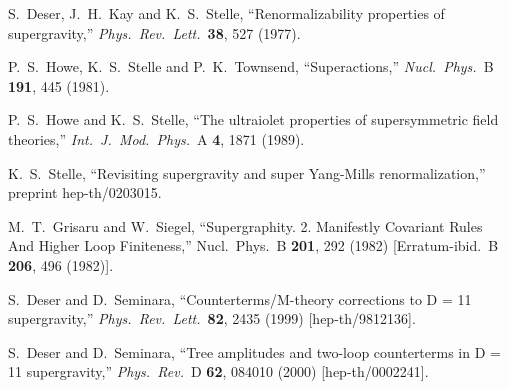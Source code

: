 \begin{thebibliography}{99}
S.~Deser, J.~H.~Kay and K.~S.~Stelle,
``Renormalizability properties of supergravity,''
{\it Phys.\ Rev.\ Lett.}\  {\bf 38}, 527 (1977).

P.~S.~Howe, K.~S.~Stelle and P.~K.~Townsend,
``Superactions,''
{\it Nucl.\ Phys.}\ B {\bf 191}, 445 (1981).

P.~S.~Howe and K.~S.~Stelle,
``The ultraiolet properties of supersymmetric field theories,''
{\it Int.\ J.\ Mod.\ Phys.}\ A {\bf 4}, 1871 (1989).

K.~S.~Stelle,
``Revisiting supergravity and super Yang-Mills renormalization,''
preprint hep-th/0203015.

M.~T.~Grisaru and W.~Siegel,
``Supergraphity. 2. Manifestly Covariant Rules And Higher Loop Finiteness,''
Nucl.\ Phys.\ B {\bf 201}, 292 (1982)
[Erratum-ibid.\ B {\bf 206}, 496 (1982)].

S.~Deser and D.~Seminara,
``Counterterms/M-theory corrections to D = 11 supergravity,''
{\it Phys.\ Rev.\ Lett.}\  {\bf 82}, 2435 (1999)
[hep-th/9812136].

S.~Deser and D.~Seminara,
``Tree amplitudes and two-loop counterterms in D = 11 supergravity,''
{\it Phys.\ Rev.}\ D {\bf 62}, 084010 (2000)
[hep-th/0002241].


\end{thebibliography}
